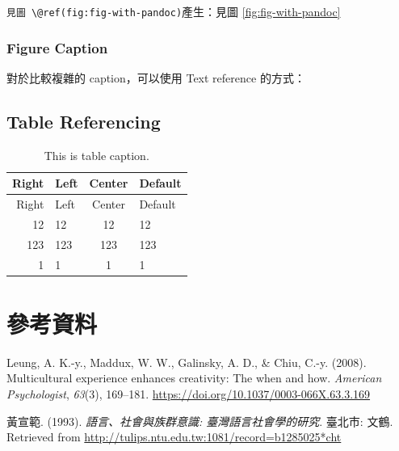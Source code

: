 \documentclass[oneside]{book}
\newenvironment{Shaded}{\begin{snugshade}}{\end{snugshade}}
\newcommand{\AlertTok}[1]{\textcolor[rgb]{0.94,0.16,0.16}{#1}}
\newcommand{\NormalTok}[1]{#1}
\let\oldhref=\href
\renewcommand{\href}[2]{#2\footnote{\url{#1}}}
\begin{document}
\texttt{見圖\ \textbackslash{}@ref(fig:fig-with-pandoc)}產生：見圖 \ref{fig:fig-with-pandoc}

\hypertarget{figure-caption}{%
\subsection{Figure Caption}\label{figure-caption}}

對於比較複雜的 caption，可以使用 Text reference 的方式：

\begin{Shaded}
\end{Shaded}

\hypertarget{table-referencing}{%
\section{Table Referencing}\label{table-referencing}}



\begin{longtable}[]{@{}rlcl@{}}
\caption{This is table caption.}\tabularnewline
\toprule
Right & Left & Center & Default\tabularnewline
\midrule
\endfirsthead
\toprule
Right & Left & Center & Default\tabularnewline
\midrule
\endhead
12 & 12 & 12 & 12\tabularnewline
123 & 123 & 123 & 123\tabularnewline
1 & 1 & 1 & 1\tabularnewline
\bottomrule
\end{longtable}

\renewcommand{\href}{\oldhref}

\hypertarget{references}{%
\chapter*{參考資料}\label{references}}

\hypertarget{refs}{}
\leavevmode\hypertarget{ref-leung2008}{}%
Leung, A. K.-y., Maddux, W. W., Galinsky, A. D., \& Chiu, C.-y. (2008). Multicultural experience enhances creativity: The when and how. \emph{American Psychologist}, \emph{63}(3), 169--181. \url{https://doi.org/10.1037/0003-066X.63.3.169}

\leavevmode\hypertarget{ref-huangxuanfan1993}{}%
黃宣範. (1993). \emph{語言、社會與族群意識: 臺灣語言社會學的研究}. 臺北市: 文鶴. Retrieved from \url{http://tulips.ntu.edu.tw:1081/record=b1285025*cht}
\end{document}
